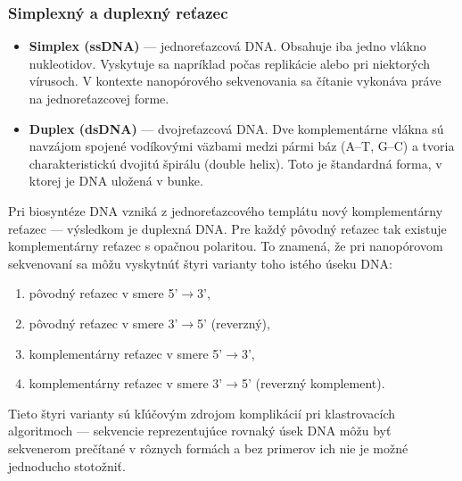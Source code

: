 \subsubsection{Simplexný a duplexný reťazec}
\begin{itemize}
    \item \textbf{Simplex (ssDNA)} --- jednoreťazcová DNA. Obsahuje iba jedno vlákno nukleotidov. Vyskytuje sa napríklad počas replikácie alebo pri niektorých vírusoch. V kontexte nanopórového sekvenovania sa čítanie vykonáva práve na jednoreťazcovej forme.
    \item \textbf{Duplex (dsDNA)} --- dvojreťazcová DNA. Dve komplementárne vlákna sú navzájom spojené vodíkovými väzbami medzi pármi báz (A--T, G--C) a tvoria charakteristickú dvojitú špirálu (double helix). Toto je štandardná forma, v ktorej je DNA uložená v bunke.
\end{itemize}

Pri biosyntéze DNA vzniká z jednoreťazcového templátu nový komplementárny reťazec --- výsledkom je duplexná DNA. Pre každý pôvodný reťazec tak existuje komplementárny reťazec s opačnou polaritou. To znamená, že pri nanopórovom sekvenovaní sa môžu vyskytnúť štyri varianty toho istého úseku DNA:
\begin{enumerate}
    \item pôvodný reťazec v smere 5'$\rightarrow$3',
    \item pôvodný reťazec v smere 3'$\rightarrow$5' (reverzný),
    \item komplementárny reťazec v smere 5'$\rightarrow$3',
    \item komplementárny reťazec v smere 3'$\rightarrow$5' (reverzný komplement).
\end{enumerate}

Tieto štyri varianty sú kľúčovým zdrojom komplikácií pri klastrovacích algoritmoch --- sekvencie reprezentujúce rovnaký úsek DNA môžu byť sekvenerom prečítané v rôznych formách a bez primerov ich nie je možné jednoducho stotožniť.
